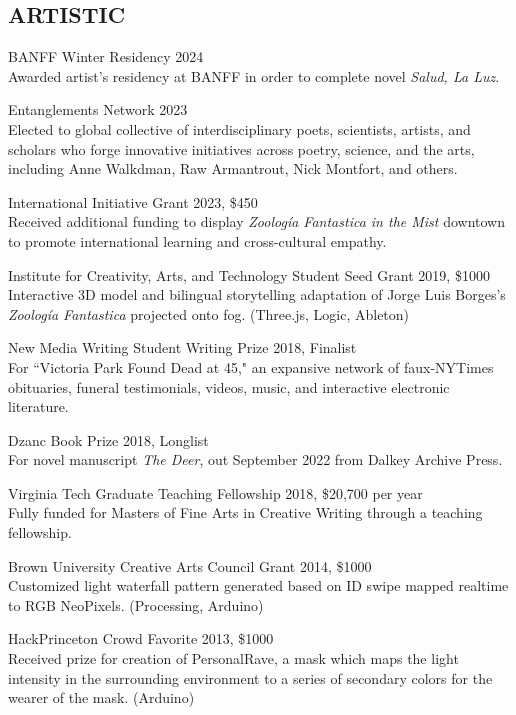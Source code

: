  \subsection{ARTISTIC}
BANFF Winter Residency 2024\\
Awarded artist's residency at BANFF in order to complete novel \emph{Salud, La Luz}.
 
Entanglements Network 2023 \\
 Elected to global collective of interdisciplinary poets, scientists, artists, and scholars who forge innovative initiatives across poetry, science, and the arts, including Anne Walkdman, Raw Armantrout, Nick Montfort, and others. 
 
 International Initiative Grant 2023, \$450  \\
Received additional funding to display \emph{Zoolog\'ia Fantastica in the Mist} downtown to promote international learning and cross-cultural empathy. 
 
 Institute for Creativity, Arts, and Technology Student Seed Grant 2019, \$1000  \\
Interactive 3D model and bilingual storytelling adaptation of Jorge Luis Borges's \emph{Zoolog\'ia Fantastica} projected onto fog. (Three.js, Logic, Ableton)

New Media Writing Student Writing Prize 2018, Finalist\\
For ``Victoria Park Found Dead at 45," an expansive network of faux-NYTimes obituaries, funeral testimonials, videos, music, and interactive electronic literature. 

Dzanc Book Prize 2018, Longlist \\
For novel manuscript \emph{The Deer}, out September 2022 from Dalkey Archive Press.

Virginia Tech Graduate Teaching Fellowship 2018, \$20,700 per year \\
Fully funded for Masters of Fine Arts in Creative Writing through a teaching fellowship.

Brown University Creative Arts Council Grant 2014, \$1000 \\
Customized light waterfall pattern generated based on ID swipe mapped realtime to RGB NeoPixels. (Processing, Arduino)

HackPrinceton Crowd Favorite 2013, \$1000 \\
Received prize for creation of PersonalRave, a mask which maps the light intensity in the surrounding environment to a series of secondary colors for the wearer of the mask. (Arduino)

